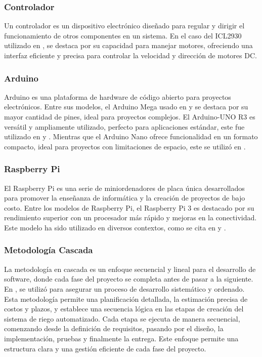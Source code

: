 \subsubsection*{Controlador}
Un controlador es un dispositivo electrónico diseñado para regular y dirigir el funcionamiento de otros componentes en un sistema. En el caso del ICL2930 utilizado en \cite{hasan_implementation_2018}, se destaca por su capacidad para manejar motores, ofreciendo una interfaz eficiente y precisa para controlar la velocidad y dirección de motores DC.

\subsubsection*{Arduino}
Arduino es una plataforma de hardware de código abierto para proyectos electrónicos. Entre sus modelos, el Arduino Mega usado en \cite{lema_holguin_implementacion_2018} \cite{alcivar_dominguez_sistema_2018} y \cite{hasan_implementation_2018} se destaca por su mayor cantidad de pines, ideal para proyectos complejos. El Arduino-UNO R3 es versátil y ampliamente utilizado, perfecto para aplicaciones estándar, este fue utilizado en \cite{haiyan_intelligent_2022} y \cite{mohammed_intelligent_nodate} . Mientras que el Arduino Nano ofrece funcionalidad en un formato compacto, ideal para proyectos con limitaciones de espacio, este se utilizó en \cite{benyezza_zoning_2021}.

\subsubsection*{Raspberry Pi}
El Raspberry Pi es una serie de miniordenadores de placa única desarrollados para promover la enseñanza de informática y la creación de proyectos de bajo costo. Entre los modelos de Raspberry Pi, el Raspberry Pi 3 es destacado por su rendimiento superior con un procesador más rápido y mejoras en la conectividad. Este modelo ha sido utilizado en diversos contextos, como se cita en \cite{benyezza_zoning_2021} y \cite{orozco_jaramillo_diseno_2019}.

\subsubsection*{Metodología Cascada}
La metodología en cascada es un enfoque secuencial y lineal para el desarrollo de software, donde cada fase del proyecto se completa antes de pasar a la siguiente. En \cite{alcivar_dominguez_sistema_2018}, se utilizó para asegurar un proceso de desarrollo sistemático y ordenado. Esta metodología permite una planificación detallada, la estimación precisa de costos y plazos, y establece una secuencia lógica en las etapas de creación del sistema de riego automatizado. Cada etapa se ejecuta de manera secuencial, comenzando desde la definición de requisitos, pasando por el diseño, la implementación, pruebas y finalmente la entrega. Este enfoque permite una estructura clara y una gestión eficiente de cada fase del proyecto.

